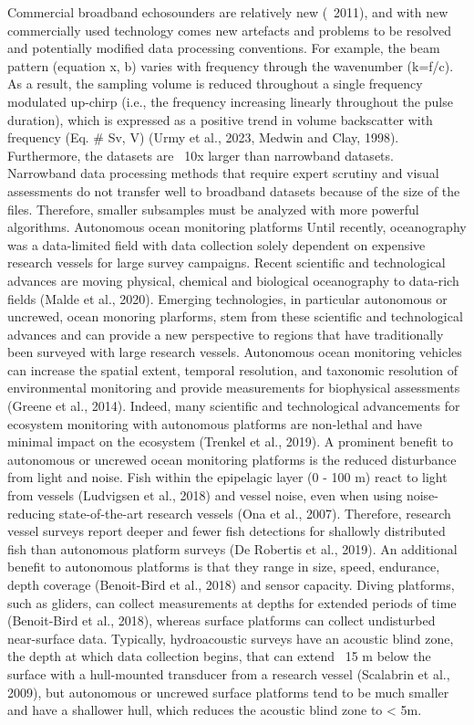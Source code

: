 Commercial broadband echosounders are relatively new (~2011), and with new commercially used technology comes new artefacts and problems to be resolved and potentially modified data processing conventions. For example, the beam pattern (equation x, b) varies with frequency through the wavenumber (k=f/c). As a result, the sampling volume is reduced throughout a single frequency modulated up-chirp (i.e., the frequency increasing linearly throughout the pulse duration), which is expressed as a positive trend in volume backscatter with frequency (Eq. # Sv, V) (Urmy et al., 2023, Medwin and Clay, 1998). Furthermore, the datasets are ~10x larger than narrowband datasets. Narrowband data processing methods that require expert scrutiny and visual assessments do not transfer well to broadband datasets because of the size of the files. Therefore, smaller subsamples must be analyzed with more powerful algorithms. 
Autonomous ocean monitoring platforms
Until recently, oceanography was a data-limited field with data collection solely dependent on expensive research vessels for large survey campaigns. Recent scientific and technological advances are moving physical, chemical and biological oceanography to data-rich fields (Malde et al., 2020). Emerging technologies, in particular autonomous or uncrewed, ocean monoring plarforms, stem from these scientific and technological advances and can provide a new perspective to regions that have traditionally been surveyed with large research vessels. Autonomous ocean monitoring vehicles can increase the spatial extent, temporal resolution, and taxonomic resolution of environmental monitoring and provide measurements for biophysical assessments (Greene et al., 2014). Indeed, many scientific and technological advancements for ecosystem monitoring with autonomous platforms are non-lethal and have minimal impact on the ecosystem (Trenkel et al., 2019). 
A prominent benefit to autonomous or uncrewed ocean monitoring platforms is the reduced disturbance from light and noise. Fish within the epipelagic layer (0 - 100 m) react to light from vessels (Ludvigsen et al., 2018) and vessel noise, even when using noise-reducing state-of-the-art research vessels (Ona et al., 2007). Therefore, research vessel surveys report deeper and fewer fish detections for shallowly distributed fish than autonomous platform surveys (De Robertis et al., 2019). 
An additional benefit to autonomous platforms is that they range in size, speed, endurance, depth coverage (Benoit-Bird et al., 2018) and sensor capacity. Diving platforms, such as gliders, can collect measurements at depths for extended periods of time (Benoit-Bird et al., 2018), whereas surface platforms can collect undisturbed near-surface data. Typically, hydroacoustic surveys have an acoustic blind zone, the depth at which data collection begins, that can extend ~15 m below the surface with a hull-mounted transducer from a research vessel (Scalabrin et al., 2009), but autonomous or uncrewed surface platforms tend to be much smaller and have a shallower hull, which reduces the acoustic blind zone to < 5m.
